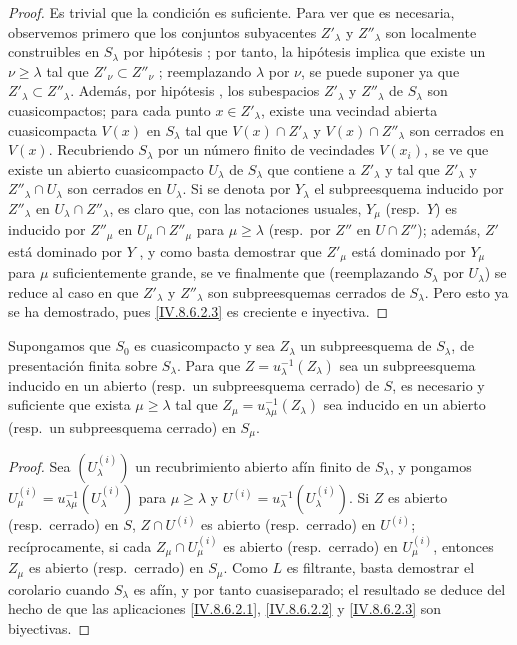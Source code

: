 \begin{proof}
Es trivial que la condición es suficiente.
Para ver que es necesaria, observemos primero que los conjuntos subyacentes $Z'_\lambda$ y $Z''_\lambda$ son localmente construibles en $S_\lambda$ por hipótesis ; por tanto, la hipótesis implica que existe un $\nu\geq\lambda$ tal que $Z'_\nu\subset Z''_\nu$ ; reemplazando $\lambda$ por $\nu$, se puede suponer ya que $Z'_\lambda\subset Z''_\lambda$.
Además, por hipótesis , los subespacios $Z'_\lambda$ y $Z''_\lambda$ de $S_\lambda$ son cuasicompactos; para cada punto $x\in Z'_\lambda$, existe una vecindad abierta cuasicompacta $V(x)$ en $S_\lambda$ tal que $V(x)\cap Z'_\lambda$ y $V(x)\cap Z''_\lambda$ son cerrados en $V(x)$.
Recubriendo $S_\lambda$ por un número finito de vecindades $V(x_i)$, se ve que existe un abierto cuasicompacto $U_\lambda$ de $S_\lambda$ que contiene a $Z'_\lambda$ y tal que $Z'_\lambda$ y $Z''_\lambda\cap U_\lambda$ son cerrados en $U_\lambda$.
Si se denota por $Y_\lambda$ el subpreesquema inducido por $Z''_\lambda$ en $U_\lambda\cap Z''_\lambda$, es claro que, con las notaciones usuales, $Y_\mu$ (resp.\ $Y$) es inducido por $Z''_\mu$ en $U_\mu\cap Z''_\mu$ para $\mu\geq\lambda$ (resp.\ por $Z''$ en $U\cap Z''$); además, $Z'$ está dominado por $Y$ , y como basta demostrar que $Z'_\mu$ está dominado por $Y_\mu$ para $\mu$
 suficientemente grande, se ve finalmente que (reemplazando $S_\lambda$ por $U_\lambda$) se reduce al caso en que $Z'_\lambda$ y $Z''_\lambda$ son subpreesquemas cerrados de $S_\lambda$.
Pero esto ya se ha demostrado, pues \eqref{IV.8.6.2.3} es creciente e inyectiva.
\end{proof}

\begin{corollary}[8.6.4]
\label{IV.8.6.4-fr}
Supongamos que $S_0$ es cuasicompacto y sea $Z_\lambda$ un subpreesquema de $S_\lambda$, de presentación finita sobre $S_\lambda$.
Para que $Z=u_\lambda^{-1}(Z_\lambda)$ sea un subpreesquema inducido en un abierto \textup{(resp.}\ un subpreesquema cerrado\textup{)} de $S$, es necesario y suficiente que exista $\mu\geq\lambda$ tal que $Z_\mu=u_{\lambda\mu}^{-1}(Z_\lambda)$ sea inducido en un abierto \textup{(resp.}\ un subpreesquema cerrado\textup{)} en $S_\mu$.
\end{corollary}

\begin{proof}
Sea $(U_\lambda^{(i)})$ un recubrimiento abierto afín finito de $S_\lambda$, y pongamos $U_\mu^{(i)}=u_{\lambda\mu}^{-1}(U_\lambda^{(i)})$ para $\mu\geq\lambda$ y $U^{(i)}=u_\lambda^{-1}(U_\lambda^{(i)})$.
Si $Z$ es abierto (resp.\ cerrado) en $S$, $Z\cap U^{(i)}$ es abierto (resp.\ cerrado) en $U^{(i)}$; recíprocamente, si cada $Z_\mu\cap U_\mu^{(i)}$ es abierto (resp.\ cerrado) en $U_\mu^{(i)}$, entonces $Z_\mu$ es abierto (resp.\ cerrado) en $S_\mu$.
Como $L$ es filtrante, basta demostrar el corolario cuando $S_\lambda$ es afín, y por tanto cuasiseparado; el resultado se deduce del hecho de que las aplicaciones \eqref{IV.8.6.2.1}, \eqref{IV.8.6.2.2} y \eqref{IV.8.6.2.3} son biyectivas.
\end{proof}

